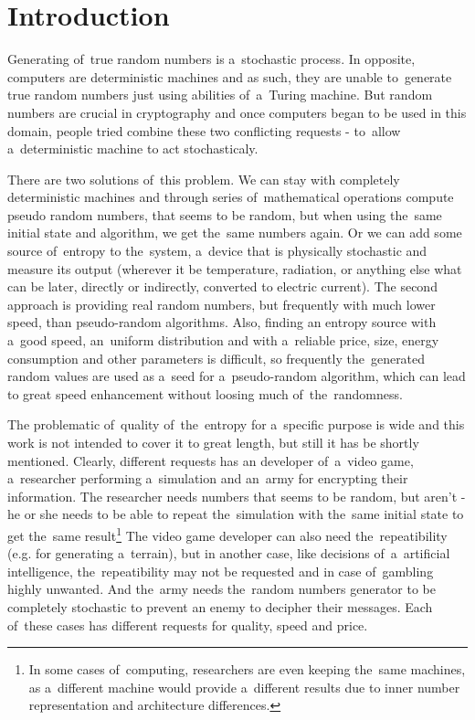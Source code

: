 \chapter{Introduction}
Generating of~true random numbers is a~stochastic process. In opposite, computers are deterministic machines and as such, they are unable to~generate true random numbers just using abilities of~a~Turing machine.  %
But random numbers are crucial in cryptography and once computers began to be used in this domain,  %
people tried combine these two conflicting requests - to~allow a~deterministic machine to act stochasticaly. 

There are two solutions of~this problem. We can stay with completely deterministic machines and through series of~mathematical operations compute pseudo random numbers, that seems to be random, but when using the~same initial state and algorithm, we get the~same numbers again. Or we can add some source of~entropy to the~system, a~device that is physically stochastic and measure its output (wherever it be temperature, radiation, or anything else what can be later, directly or indirectly, converted to electric current). The second approach is providing real random numbers, but frequently with much lower speed, than pseudo-random algorithms. Also, finding an entropy source with a~good speed, an~uniform distribution and with a~reliable price, size, energy consumption and other parameters is difficult, so frequently the~generated random values are used as a~seed for a~pseudo-random algorithm, which can lead to great speed enhancement without loosing much of~the~randomness.

The problematic of~quality of~the~entropy for a~specific purpose is wide and this work is not intended to cover it to great length, but still it has be shortly mentioned. Clearly, different requests has an developer of~a~video game, a~researcher performing a~simulation and an~army for encrypting their information. The researcher needs numbers that seems to be random, but aren't - he or she needs to be able to repeat the~simulation with the~same initial state to get the~same result\footnote{In some cases of~computing, researchers are even keeping the~same machines, as a~different machine would provide a~different results due to inner number representation and architecture differences.\cite{ArithmeticInCloud}%
}
The video game developer can also need the~repeatibility (e.g. for generating a~terrain), but in another case, like decisions of~a~artificial intelligence, the~repeatibility may not be requested and in case of~gambling highly unwanted. And the~army needs the~random numbers generator to be completely stochastic to prevent an enemy to decipher their messages. Each of~these cases has different requests for quality, speed and price.

